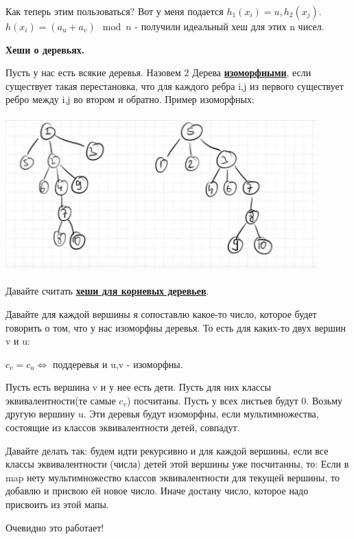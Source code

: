 \documentclass{article}
\newcommand{\deff}[1]{\underline{\textbf{#1}}}
\begin{document}
Как теперь этим пользоваться? Вот у меня подается $h_1(x_i) = u, h_2(x_j)$. $h(x_i) = (a_u + a_v) \mod n $ - получили идеальный хеш для этих n чисел. 

\textbf{Хеши о деревьях.}

Пусть у нас есть всякие деревья. Назовем 2 Дерева \deff{изоморфными}, если существует такая перестановка, что для каждого ребра i,j из первого существует ребро между i,j во втором и обратно. Пример изоморфных:

\includegraphics[width=12cm, height=6cm]{13.2.jpg}

Давайте считать \deff{хеши для  корневых деревьев}.

Давайте для каждой вершины я сопоставлю какое-то число, которое будет говорить о том, что у нас изоморфны деревья. То есть для каких-то двух вершин v и u:

$c_v = c_u \Leftrightarrow$ поддеревья и u,v - изоморфны.

Пусть есть вершина v и у нее есть дети. Пусть для них классы эквивалентности(те самые $c_v$) посчитаны. Пусть у всех листьев будут 0.  Возьму другую  вершину u. Эти деревья будут изоморфны, если  мультимножества, состоящие из классов эквивалентности детей, совпадут.

Давайте делать так: будем идти рекурсивно и для каждой вершины, если все классы эквивалентности (числа) детей этой вершины уже посчитанны, то:
Если в map нету мультимножество классов эквивалентности для текущей вершины, то добавлю и присвою ей новое число. Иначе достану число, которое надо присвоить из этой мапы.

Очевидно это работает!
\end{document}
